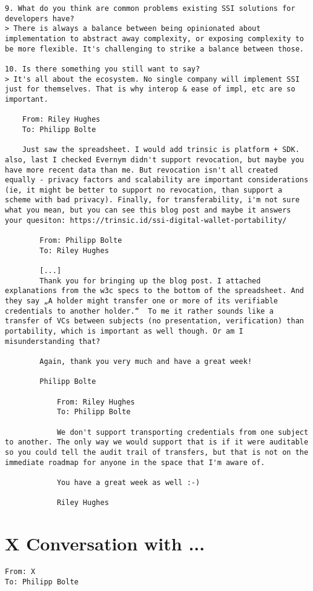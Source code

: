 \begin{Verbatim}[breaklines=true, breaksymbol={}, breaksymbolsepleftnchars=2]
9. What do you think are common problems existing SSI solutions for developers have? 
> There is always a balance between being opinionated about implementation to abstract away complexity, or exposing complexity to be more flexible. It's challenging to strike a balance between those.

10. Is there something you still want to say?
> It's all about the ecosystem. No single company will implement SSI just for themselves. That is why interop & ease of impl, etc are so important.

    From: Riley Hughes
    To: Philipp Bolte
    
    Just saw the spreadsheet. I would add trinsic is platform + SDK. also, last I checked Evernym didn't support revocation, but maybe you have more recent data than me. But revocation isn't all created equally - privacy factors and scalability are important considerations (ie, it might be better to support no revocation, than support a scheme with bad privacy). Finally, for transferability, i'm not sure what you mean, but you can see this blog post and maybe it answers your quesiton: https://trinsic.id/ssi-digital-wallet-portability/

        From: Philipp Bolte
        To: Riley Hughes
        
        [...]
        Thank you for bringing up the blog post. I attached explanations from the w3c specs to the bottom of the spreadsheet. And they say „A holder might transfer one or more of its verifiable credentials to another holder.“  To me it rather sounds like a transfer of VCs between subjects (no presentation, verification) than portability, which is important as well though. Or am I misunderstanding that?
        
        Again, thank you very much and have a great week!
        
        Philipp Bolte

            From: Riley Hughes
            To: Philipp Bolte
            
            We don't support transporting credentials from one subject to another. The only way we would support that is if it were auditable so you could tell the audit trail of transfers, but that is not on the immediate roadmap for anyone in the space that I'm aware of.
            
            You have a great week as well :-)
            
            Riley Hughes
\end{Verbatim}

\section*{X Conversation with ...}\label{appendix: x}
\begin{Verbatim}[breaklines=true, breaksymbol={}, breaksymbolsepleftnchars=2]
From: X
To: Philipp Bolte


\end{Verbatim}